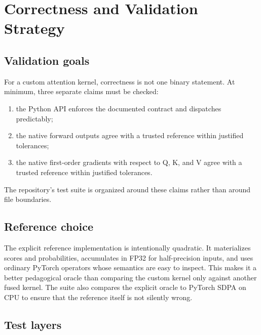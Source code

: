 \chapter{Correctness and Validation Strategy}
\label{chap:correctness}

\section{Validation goals}

For a custom attention kernel, correctness is not one binary statement. At minimum, three separate claims must be checked:
\begin{enumerate}
  \item the Python API enforces the documented contract and dispatches predictably;
  \item the native forward outputs agree with a trusted reference within justified tolerances;
  \item the native first-order gradients with respect to Q, K, and V agree with a trusted reference within justified tolerances.
\end{enumerate}
The repository's test suite is organized around these claims rather than around file boundaries.

\section{Reference choice}

The explicit reference implementation is intentionally quadratic. It materializes scores and probabilities, accumulates in FP32 for half-precision inputs, and uses ordinary PyTorch operators whose semantics are easy to inspect. This makes it a better pedagogical oracle than comparing the custom kernel only against another fused kernel. The suite also compares the explicit oracle to PyTorch SDPA on CPU to ensure that the reference itself is not silently wrong.

\section{Test layers}

